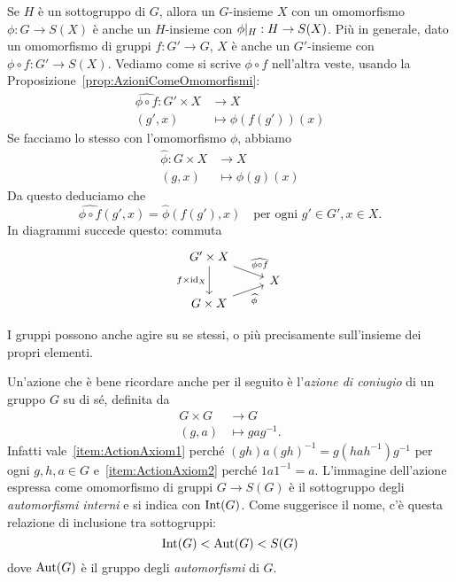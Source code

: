 \begin{esem}\label{esem:ComporreAzioniConOmomorfismi}
Se $H$ è un sottogruppo di $G$, allora un $G$-insieme $X$ con un omomorfismo $\phi : G\to S(X)$ è anche un $H$-insieme con $\phi{|}_{H} : H\to S(X)$. Più in generale, dato un omomorfismo di gruppi $f : G'\to G$, $X$ è anche un $G'$-insieme con $\phi \circ f : G'\to S(X)$. Vediamo come si scrive $\phi \circ f$ nell'altra veste, usando la Proposizione~\ref{prop:AzioniComeOmomorfismi}:
\[\begin{aligned}
\widehat{\phi \circ f} : G' \times X &\to X \\
\left(g', x\right) &\mapsto \phi (f(g'))(x)
\end{aligned}\]
Se facciamo lo stesso con l'omomorfismo $\phi$, abbiamo
\[\begin{aligned}
\widehat\phi : G \times X &\to X \\
(g, x) &\mapsto \phi(g)(x)
\end{aligned}\]
Da questo deduciamo che
\[\widehat{\phi \circ f}\left(g', x\right) = \widehat\phi\left(f\left(g'\right), x\right) \quad\text{per ogni } g' \in G', x \in X .\]
In diagrammi succede questo: commuta
\[\begin{tikzcd}[row sep=tiny]
G' \times X \ar["{\widehat{\phi \circ f}}", dr] \ar["{f \times \id_X}", dd, swap] \\
& X \\
G \times X \ar["{\widehat\phi}", ur, swap]
\end{tikzcd}\]
\end{esem}


I gruppi possono anche agire su se stessi, o più precisamente sull'insieme dei propri elementi.

\begin{esem}\label{esem:AzioneConiugio}
Un'azione che è bene ricordare anche per il seguito è l'{\em azione di coniugio} di un gruppo $G$ su di sé, definita da
\[
\begin{aligned}
G \times G &\to G \\
(g,a) &\mapsto gag^{-1} .
\end{aligned}
\]
Infatti vale~\ref{item:ActionAxiom1} perché $(gh)a(gh)^{-1}=g(hah^{-1})g^{-1}$ per ogni $g,h,a\in G$ e~\ref{item:ActionAxiom2} perché $1a1^{-1}=a$. L'immagine dell'azione espressa come omomorfismo di gruppi $G \to S(G)$ è il sottogruppo degli {\em automorfismi interni} e si indica con $\mathrm{Int}(G)$. Come suggerisce il nome, c'è questa relazione di inclusione tra sottogruppi:
\[\mathrm{Int}(G) < \mathrm{Aut}(G) < S(G)\]
dove $\mathrm{Aut}(G)$ è il gruppo degli {\em automorfismi} di $G$.
\end{esem}

